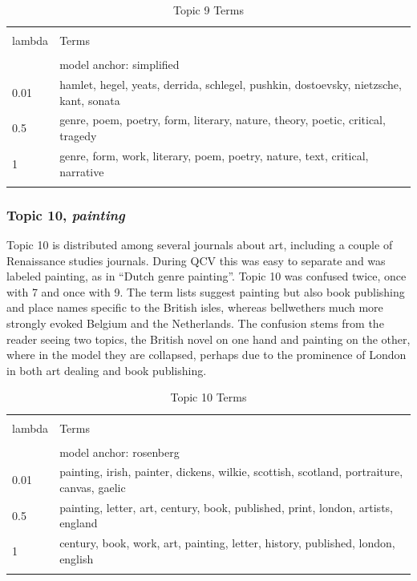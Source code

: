 \documentclass[]{book}
\theoremstyle{definition}
\theoremstyle{definition}
\theoremstyle{definition}
\theoremstyle{remark}
\begin{document}
\begin{table}[!htbp] \centering 
  \caption{Topic 9 Terms} 
  \label{tab:t9d} 
\begin{tabularx}{\textwidth}{@{\extracolsep{5pt}} lY} 
\\[-1.8ex]\hline 
\hline \\[-1.8ex] 
lambda & Terms \\ 
\hline \\[-1.8ex] 
 & model anchor: simplified \\ 
0.01 & hamlet, hegel, yeats, derrida, schlegel, pushkin, dostoevsky, nietzsche, kant, sonata \\ 
0.5 & genre, poem, poetry, form, literary, nature, theory, poetic, critical, tragedy \\ 
1 & genre, form, work, literary, poem, poetry, nature, text, critical, narrative \\ 
\hline \\[-1.8ex] 
\end{tabularx} 
\end{table}

\hypertarget{topic-10-painting}{%
\subsubsection{\texorpdfstring{Topic 10,
\emph{painting}}{Topic 10, painting}}\label{topic-10-painting}}

Topic 10 is distributed among several journals about art, including a
couple of Renaissance studies journals. During QCV this was easy to
separate and was labeled painting, as in ``Dutch genre painting''. Topic
10 was confused twice, once with 7 and once with 9. The term lists
suggest painting but also book publishing and place names specific to
the British isles, whereas bellwethers much more strongly evoked Belgium
and the Netherlands. The confusion stems from the reader seeing two
topics, the British novel on one hand and painting on the other, where
in the model they are collapsed, perhaps due to the prominence of London
in both art dealing and book publishing.

\begin{table}[!htbp] \centering 
  \caption{Topic 10 Terms} 
  \label{tab:t10d} 
\begin{tabularx}{\textwidth}{@{\extracolsep{5pt}} lY} 
\\[-1.8ex]\hline 
\hline \\[-1.8ex] 
lambda & Terms \\ 
\hline \\[-1.8ex] 
 & model anchor: rosenberg \\ 
0.01 & painting, irish, painter, dickens, wilkie, scottish, scotland, portraiture, canvas, gaelic \\ 
0.5 & painting, letter, art, century, book, published, print, london, artists, england \\ 
1 & century, book, work, art, painting, letter, history, published, london, english \\ 
\hline \\[-1.8ex] 
\end{tabularx} 
\end{table}
\end{document}
